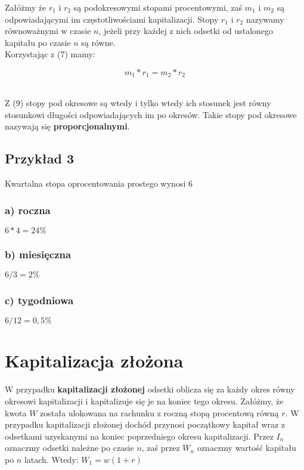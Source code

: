 \documentclass{article}
\begin{document}
Załóżmy że $ r_1 $ i $ r_2 $ są podokresowymi stopami procentowymi, zaś $ m_1 $ i $ m_2 $ są odpowiadającymi im częstotliwościami kapitalizacji. Stopy $ r_1 $ i $ r_2 $ nazywamy równoważnymi w czasie $ n $, jeżeli przy każdej z nich odsetki od ustalonego kapitału po czasie $ n $ są równe.\\

Korzystając z (7) mamy:\\

\begin{center}
	\begin{equation}
		m_1 * r_1 = m_2 * r_2
	\end{equation}
\end{center}\\

Z (9) stopy pod okresowe są wtedy i tylko wtedy ich stosunek jest równy stosunkowi długości odpowiadających im po okresów. Takie stopy pod okresowe nazywają się \textbf{proporcjonalnymi}.

\subsection{Przykład 3}
Kwartalna stopa oprocentowania prostego wynosi 6%

\subsubsection{a) roczna}
$ 6 * 4 = 24\% $
\subsubsection{b) miesięczna}
$ 6 / 3 = 2\% $
\subsubsection{c) tygodniowa}
$ 6 / 12 = 0,5\% $

\newpage

%
%

\section{Kapitalizacja złożona}
W przypadku \textbf{kapitalizacji złożonej} odsetki oblicza się za każdy okres równy okresowi kapitalizacji i kapitalizuje się je na koniec tego okresu. Załóżmy, że kwota $ W $ została ulokowana na rachunku z roczną stopą procentową równą $ r $. W przypadku kapitalizacji złożonej dochód przynosi początkowy kapitał wraz z odsetkami uzyskanymi na koniec poprzedniego okresu kapitalizacji. Przez $ I_n $ oznaczmy odsetki należne po czasie $ n $, zaś przez $ W_n $ oznaczmy wartość kapitału po $ n $ latach. Wtedy: $ W_1 = w(1+r) $\\
\end{document}
